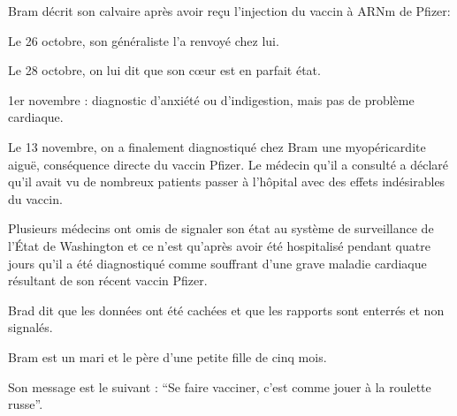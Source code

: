 Bram décrit son calvaire après avoir reçu l'injection du vaccin à ARNm de
Pfizer:

Le 26 octobre, son généraliste l'a renvoyé chez lui.

Le 28 octobre, on lui dit que son cœur est en parfait état.

1er novembre : diagnostic d'anxiété ou d'indigestion, mais pas de problème
cardiaque.

Le 13 novembre, on a finalement diagnostiqué chez Bram une myopéricardite aiguë,
conséquence directe du vaccin Pfizer. Le médecin qu'il a consulté a déclaré
qu'il avait vu de nombreux patients passer à l'hôpital avec des effets
indésirables du vaccin.

Plusieurs médecins ont omis de signaler son état au système de surveillance de
l'État de Washington et ce n'est qu'après avoir été hospitalisé pendant quatre
jours qu'il a été diagnostiqué comme souffrant d'une grave maladie cardiaque
résultant de son récent vaccin Pfizer.

Brad dit que les données ont été cachées et que les rapports sont enterrés et
non signalés.

Bram est un mari et le père d'une petite fille de cinq mois.

Son message est le suivant : “Se faire vacciner, c'est comme jouer à la roulette
russe”.


